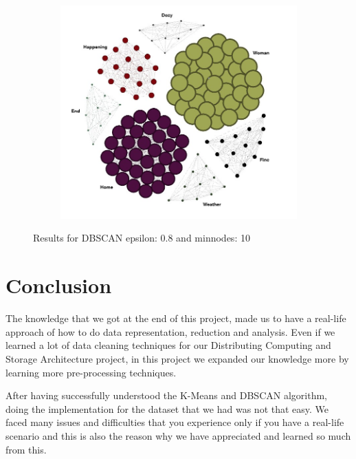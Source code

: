 \documentclass{article}
\begin{document}
\begin{figure}[H]
    \begin{subfigure} {1\textwidth}  
        \centering 
        \includegraphics[width=0.8\linewidth]{./img/dbscan.jpeg}
    \end{subfigure}    
    \caption{Results for DBSCAN epsilon: 0.8 and minnodes: 10}
    \label{fig:movement}
\end{figure}


\newpage
\section{Conclusion}
The knowledge that we got at the end of this project, made us to have a real-life approach of how to do data representation, reduction and analysis. Even if we learned a lot of data cleaning techniques for our Distributing Computing and Storage Architecture project, in this project we expanded our knowledge more by learning more pre-processing techniques. 

After having successfully understood the K-Means and DBSCAN algorithm, doing the implementation for the dataset that we had was not that easy. We faced many issues and difficulties that you experience only if you have a real-life scenario and this is also the reason why we have appreciated and learned so much from this.


\newpage


\nocite{*}
\end{document}

